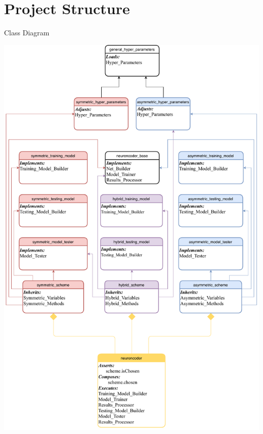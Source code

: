 \documentclass{beamer}
\begin{document}
		\section{Project Structure}
		\begin{frame}{Class Diagram}
			\begin{center}
				\includegraphics[height=0.9\textheight]{classDiagram}
			\end{center}
		\end{frame}
\end{document}

